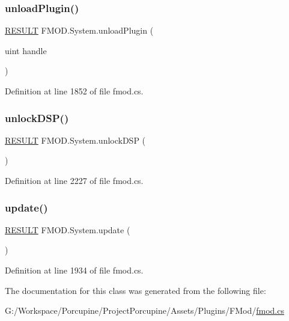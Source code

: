 \subsubsection{\texorpdfstring{unload\+Plugin()}{unloadPlugin()}}
{\footnotesize\ttfamily \hyperlink{namespace_f_m_o_d_a305d1176ef3f8c8815861a60407ac33d}{R\+E\+S\+U\+LT} F\+M\+O\+D.\+System.\+unload\+Plugin (\begin{DoxyParamCaption}\item[{uint}]{handle }\end{DoxyParamCaption})}



Definition at line 1852 of file fmod.\+cs.

\mbox{\label{class_f_m_o_d_1_1_system_a3a7e97d6481504ffe16fe6fff0a5a666}} 
\subsubsection{\texorpdfstring{unlock\+D\+S\+P()}{unlockDSP()}}
{\footnotesize\ttfamily \hyperlink{namespace_f_m_o_d_a305d1176ef3f8c8815861a60407ac33d}{R\+E\+S\+U\+LT} F\+M\+O\+D.\+System.\+unlock\+D\+SP (\begin{DoxyParamCaption}{ }\end{DoxyParamCaption})}



Definition at line 2227 of file fmod.\+cs.

\mbox{\label{class_f_m_o_d_1_1_system_a88ff07d3c56a36518d179100c8ef1fab}} 
\subsubsection{\texorpdfstring{update()}{update()}}
{\footnotesize\ttfamily \hyperlink{namespace_f_m_o_d_a305d1176ef3f8c8815861a60407ac33d}{R\+E\+S\+U\+LT} F\+M\+O\+D.\+System.\+update (\begin{DoxyParamCaption}{ }\end{DoxyParamCaption})}



Definition at line 1934 of file fmod.\+cs.



The documentation for this class was generated from the following file\+:\begin{DoxyCompactItemize}
\item 
G\+:/\+Workspace/\+Porcupine/\+Project\+Porcupine/\+Assets/\+Plugins/\+F\+Mod/\hyperlink{fmod_8cs}{fmod.\+cs}\end{DoxyCompactItemize}
